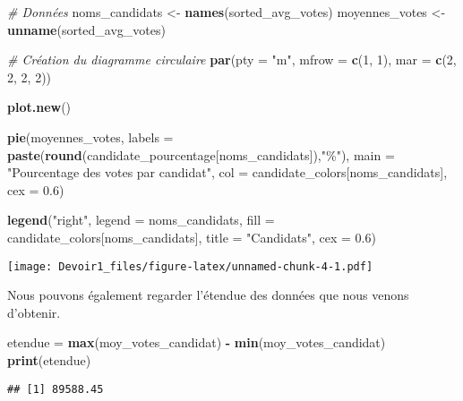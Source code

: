 \documentclass[
]{article}
\newenvironment{Shaded}{\begin{snugshade}}{\end{snugshade}}
\newcommand{\AttributeTok}[1]{\textcolor[rgb]{0.13,0.29,0.53}{#1}}
\newcommand{\CommentTok}[1]{\textcolor[rgb]{0.56,0.35,0.01}{\textit{#1}}}
\newcommand{\DecValTok}[1]{\textcolor[rgb]{0.00,0.00,0.81}{#1}}
\newcommand{\FloatTok}[1]{\textcolor[rgb]{0.00,0.00,0.81}{#1}}
\newcommand{\FunctionTok}[1]{\textcolor[rgb]{0.13,0.29,0.53}{\textbf{#1}}}
\newcommand{\NormalTok}[1]{#1}
\newcommand{\OtherTok}[1]{\textcolor[rgb]{0.56,0.35,0.01}{#1}}
\newcommand{\SpecialCharTok}[1]{\textcolor[rgb]{0.81,0.36,0.00}{\textbf{#1}}}
\newcommand{\StringTok}[1]{\textcolor[rgb]{0.31,0.60,0.02}{#1}}
\begin{document}
\begin{Shaded}
\begin{Highlighting}[]
\CommentTok{\# Données}
\NormalTok{noms\_candidats }\OtherTok{\textless{}{-}} \FunctionTok{names}\NormalTok{(sorted\_avg\_votes)}
\NormalTok{moyennes\_votes }\OtherTok{\textless{}{-}} \FunctionTok{unname}\NormalTok{(sorted\_avg\_votes)}


\CommentTok{\# Création du diagramme circulaire}
\FunctionTok{par}\NormalTok{(}\AttributeTok{pty =} \StringTok{"m"}\NormalTok{, }\AttributeTok{mfrow =} \FunctionTok{c}\NormalTok{(}\DecValTok{1}\NormalTok{, }\DecValTok{1}\NormalTok{), }\AttributeTok{mar =} \FunctionTok{c}\NormalTok{(}\DecValTok{2}\NormalTok{, }\DecValTok{2}\NormalTok{, }\DecValTok{2}\NormalTok{, }\DecValTok{2}\NormalTok{))}

\FunctionTok{plot.new}\NormalTok{()}

\FunctionTok{pie}\NormalTok{(moyennes\_votes, }
    \AttributeTok{labels =} \FunctionTok{paste}\NormalTok{(}\FunctionTok{round}\NormalTok{(candidate\_pourcentage[noms\_candidats]),}\StringTok{"\%"}\NormalTok{),}
    \AttributeTok{main =} \StringTok{"Pourcentage des votes par candidat"}\NormalTok{, }
    \AttributeTok{col =}\NormalTok{ candidate\_colors[noms\_candidats],}
    \AttributeTok{cex =} \FloatTok{0.6}\NormalTok{)}

\FunctionTok{legend}\NormalTok{(}\StringTok{"right"}\NormalTok{, }
       \AttributeTok{legend =}\NormalTok{ noms\_candidats, }
       \AttributeTok{fill =}\NormalTok{ candidate\_colors[noms\_candidats], }
       \AttributeTok{title =} \StringTok{"Candidats"}\NormalTok{, }
       \AttributeTok{cex =} \FloatTok{0.6}\NormalTok{)}
\end{Highlighting}
\end{Shaded}

\texttt{[image: Devoir1\_files/figure-latex/unnamed-chunk-4-1.pdf]}

Nous pouvons également regarder l'étendue des données que nous venons
d'obtenir.

\begin{Shaded}
\begin{Highlighting}[]
\NormalTok{etendue }\OtherTok{=} \FunctionTok{max}\NormalTok{(moy\_votes\_candidat) }\SpecialCharTok{{-}} \FunctionTok{min}\NormalTok{(moy\_votes\_candidat)}
\FunctionTok{print}\NormalTok{(etendue)}
\end{Highlighting}
\end{Shaded}

\begin{verbatim}
## [1] 89588.45
\end{verbatim}
\end{document}
